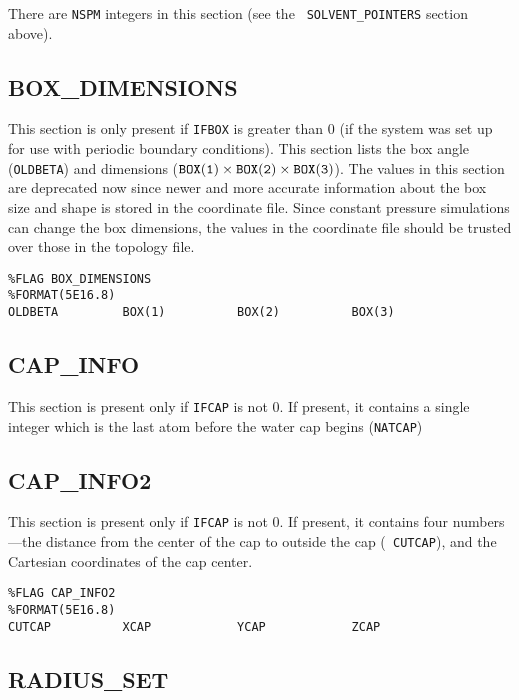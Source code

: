 
\noindent There are {\tt NSPM} integers in this section (see the {\tt
SOLVENT\_POINTERS} section above).

\subsection*{BOX\_DIMENSIONS}

This section is only present if {\tt IFBOX} is greater than 0 (\ie if the system
was set up for use with periodic boundary conditions). This section lists the
box angle ({\tt OLDBETA}) and dimensions (${\tt BOX(1)} \times {\tt BOX(2)}
\times {\tt BOX(3)}$). The values in this section are deprecated now since newer
and more accurate information about the box size and shape is stored in the
coordinate file. Since constant pressure simulations can change the box
dimensions, the values in the coordinate file should be trusted over those in
the topology file.

\begin{verbatim}
%FLAG BOX_DIMENSIONS
%FORMAT(5E16.8)
OLDBETA         BOX(1)          BOX(2)          BOX(3)
\end{verbatim}

\subsection*{CAP\_INFO}

This section is present only if {\tt IFCAP} is not 0. If present, it contains a
single integer which is the last atom before the water cap begins ({\tt NATCAP})


\subsection*{CAP\_INFO2}

This section is present only if {\tt IFCAP} is not 0. If present, it contains
four numbers---the distance from the center of the cap to outside the cap ({\tt
CUTCAP}), and the Cartesian coordinates of the cap center.

\begin{verbatim}
%FLAG CAP_INFO2
%FORMAT(5E16.8)
CUTCAP          XCAP            YCAP            ZCAP
\end{verbatim}

\subsection*{RADIUS\_SET}

